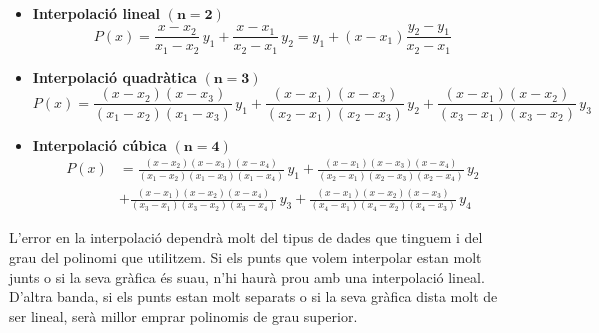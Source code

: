 \begin{itemize}
    \item \textbf{Interpolació lineal} $\boldsymbol{(n=2)}$ 
    \begin{equation}\label{eq:interp_lin}
      P(x) = \frac{x-x_2}{x_1-x_2}\, y_1 + \frac{x-x_1}{x_2-x_1}\, y_2 = y_1 + (x-x_1) \frac{y_2-y_1}{x_2-x_1}
    \end{equation}

    \item \textbf{Interpolació quadràtica} $\boldsymbol{(n=3)}$ 
    \begin{equation}
      P(x) = \frac{(x-x_2)(x-x_3)}{(x_1-x_2)(x_1-x_3)}\, y_1 + \frac{(x-x_1)(x-x_3)}{(x_2-x_1)(x_2-x_3)}\, y_2 +
      \frac{(x-x_1)(x-x_2)}{(x_3-x_1)(x_3-x_2)}\, y_3
    \end{equation}

    \item \textbf{Interpolació cúbica} $\boldsymbol{(n=4)}$ 
    \begin{equation}\begin{split}\label{eq:interp_cub}
      P(x) &= \frac{(x-x_2)(x-x_3)(x-x_4)}{(x_1-x_2)(x_1-x_3)(x_1-x_4)}\, y_1 +
              \frac{(x-x_1)(x-x_3)(x-x_4)}{(x_2-x_1)(x_2-x_3)(x_2-x_4)}\, y_2  \\[1.5ex]
           &+ \frac{(x-x_1)(x-x_2)(x-x_4)}{(x_3-x_1)(x_3-x_2)(x_3-x_4)}\, y_3 +
              \frac{(x-x_1)(x-x_2)(x-x_3)}{(x_4-x_1)(x_4-x_2)(x_4-x_3)}\, y_4
    \end{split}\end{equation}
\end{itemize}


L'error en la interpolació dependrà molt del tipus de dades que tinguem i del grau del polinomi que utilitzem. Si els punts que volem interpolar estan molt junts o si la seva gràfica és suau, n'hi haurà prou amb una interpolació lineal. D'altra banda, si els punts estan molt separats o si la seva gràfica dista molt de ser lineal, serà millor emprar polinomis de grau superior.


